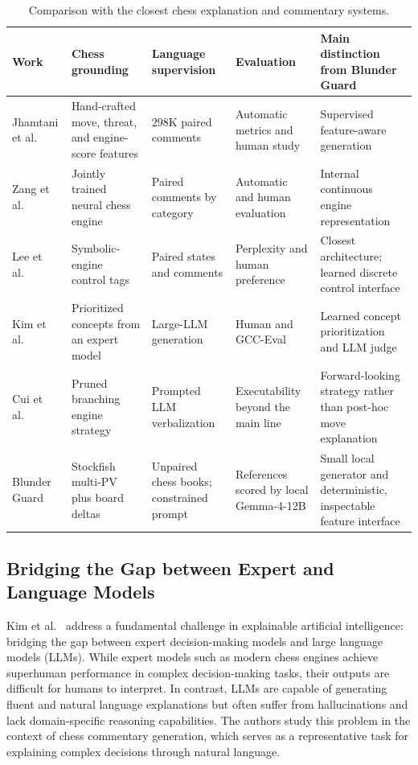 \documentclass[sigconf,nonacm]{acmart}
\begin{document}
\begin{table}[htbp]
\centering
\caption{Comparison with the closest chess explanation and commentary systems.}
\label{tab:related-comparison}
\begin{tabular}{@{}p{3.0cm}p{3.0cm}p{3.1cm}p{3.4cm}p{3.2cm}@{}}
\toprule
\textbf{Work} & \textbf{Chess grounding} & \textbf{Language supervision} & \textbf{Evaluation} & \textbf{Main distinction from Blunder Guard} \\
\midrule
Jhamtani et al.~\cite{jhamtani2018chess} & Hand-crafted move, threat, and engine-score features & 298K paired comments & Automatic metrics and human study & Supervised feature-aware generation \\
Zang et al.~\cite{zang2019automated} & Jointly trained neural chess engine & Paired comments by category & Automatic and human evaluation & Internal continuous engine representation \\
Lee et al.~\cite{lee2022improving} & Symbolic-engine control tags & Paired states and comments & Perplexity and human preference & Closest architecture; learned discrete control interface \\
Kim et al.~\cite{kim2025ccc} & Prioritized concepts from an expert model & Large-LLM generation & Human and GCC-Eval & Learned concept prioritization and LLM judge \\
Cui et al.~\cite{cui2026strategies} & Pruned branching engine strategy & Prompted LLM verbalization & Executability beyond the main line & Forward-looking strategy rather than post-hoc move explanation \\
Blunder Guard & Stockfish multi-PV plus board deltas & Unpaired chess books; constrained prompt & References scored by local Gemma-4-12B & Small local generator and deterministic, inspectable feature interface \\
\bottomrule
\end{tabular}
\end{table}

\subsection{Bridging the Gap between Expert and Language Models}

Kim et al.~\cite{kim2025ccc} address a fundamental challenge in explainable artificial intelligence: bridging the gap between expert decision-making models and large language models (LLMs). While expert models such as modern chess engines achieve superhuman performance in complex decision-making tasks, their outputs are difficult for humans to interpret. In contrast, LLMs are capable of generating fluent and natural language explanations but often suffer from hallucinations and lack domain-specific reasoning capabilities. The authors study this problem in the context of chess commentary generation, which serves as a representative task for explaining complex decisions through natural language.
\end{document}

